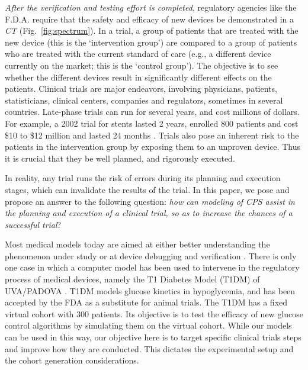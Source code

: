 \emph{After the verification and testing effort is completed}, regulatory agencies like the F.D.A. require that the safety and efficacy of new devices be demonstrated in a \emph{CT} (Fig.~\ref{fig:spectrum}).
In a trial, a group of patients that are treated with the new device (this is the `intervention group') are compared to a group of patients who are treated with the current standard of care (e.g., a different device currently on the market; this is the `control group').
The objective is to see whether the different devices result in significantly different effects on the patients.
Clinical trials are major endeavors, involving physicians, patients, statisticians, clinical centers, companies and regulators, sometimes in several countries.
Late-phase trials can run for several years, and cost millions of dollars.
For example, a 2002 trial for stents lasted 2 years, enrolled 800 patients and cost \$10 to \$12 million and lasted 24 months \cite{Kaplan04_Cost}.
Trials also pose an inherent risk to the patients in the intervention group by exposing them to an unproven device.
Thus it is crucial that they be well planned, and rigorously executed.

In reality, any trial runs the risk of errors during its planning and execution stages, which can invalidate the results of the trial.
In this paper, we pose and propose an answer to the following question: \emph{how can modeling of CPS assist in the planning and execution of a clinical trial, so as to increase the chances of a successful trial}?

Most medical models today are aimed at either better understanding the phenomenon under study \cite{vfiborganization_Tusscher07} or at device debugging and verification \cite{VHM_proc}. 
There is only one case in which a computer model has been used to intervene in the regulatory process of medical devices, namely the T1 Diabetes Model (T1DM) of UVA/PADOVA \cite{T1DM}.
T1DM models glucose kinetics in hypoglycemia, and has been accepted by the FDA as a substitute for animal trials.
The T1DM has a fixed virtual cohort with 300 patients.
Its objective is to test the efficacy of new glucose control algorithms by simulating them on the virtual cohort.
While our models can be used in this way, our objective here is to target specific clinical trials steps and improve how they are conducted.
This dictates the experimental setup and the cohort generation considerations.

